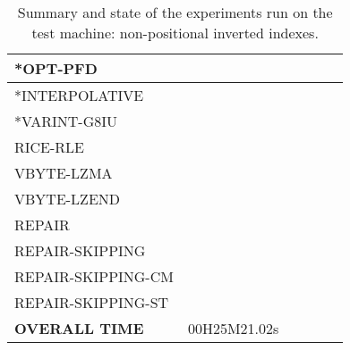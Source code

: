\begin{table}[htbp]
\begin{tabular}{|l|r|r|c|c|c|c|}
   *OPT-PFD                  &       &       &       &       &       &    \\ \hline
   *INTERPOLATIVE            &       &       &       &       &       &    \\ \hline
   *VARINT-G8IU              &       &       &       &       &       &    \\ \hline
   RICE-RLE                  &       &       &       &       &       &    \\ \hline
   VBYTE-LZMA                &       &       &       &       &       &    \\ \hline
   VBYTE-LZEND               &       &       &       &       &       &    \\ \hline
   REPAIR                    &       &       &       &       &       &    \\ \hline
   REPAIR-SKIPPING           &       &       &       &       &       &    \\ \hline
   REPAIR-SKIPPING-CM        &       &       &       &       &       &    \\ \hline
   REPAIR-SKIPPING-ST        &       &       &       &       &       &    \\ \hline
   \hline
   \textbf{OVERALL TIME }    &     \multicolumn{2}{|c|}{  00H25M21.02s }   &\multicolumn{4}{|r}{}  \\

\cline{1-3}    
   \end{tabular}%
  \caption{Summary and state of the experiments run on the test machine: non-positional inverted indexes.}
  \label{tab:addlabel}%
\end{table}%






